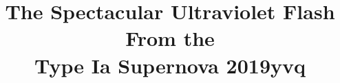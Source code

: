 \documentclass[twocolumn]{aastex63}
\begin{document}
\title{The Spectacular Ultraviolet Flash From the \\ Type Ia Supernova 2019yvq}


\end{document}
